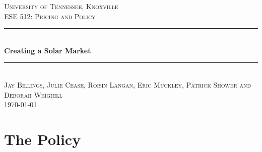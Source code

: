 \documentclass[10pt]{book} %
\begin{document}

\begin{titlepage}

\newcommand{\HRule}{\rule{\linewidth}{0.5mm}} %

\center %

\textsc{\LARGE University of Tennessee, Knoxville}\\[1.5cm] %
\textsc{\Large ESE 512: Pricing and Policy}\\[0.5cm] %

\HRule \\[0.4cm]
{ \huge \bfseries Creating a Solar Market}\\[0.4cm] %
\HRule \\[1.5cm]

\textsc{\large Jay Billings, Julie Cease, Roisin Langan, Eric Muckley, Patrick Shower and Deborah Weighill}\\[0.5cm] %





{\large \today}\\[3cm] %




\end{titlepage}






\chapter{The Policy}
\end{document}
